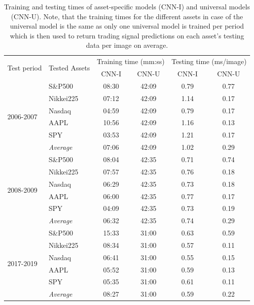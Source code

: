 \documentclass[11pt, a4paper]{article}
\begin{document}
\begin{table}[H]
\centering
\begin{tabular}{l|l|cc|cc}
\multicolumn{1}{m{1cm}|}{\multirow{2}{1cm}{Test period}} & \multicolumn{1}{m{1.5cm}|}{\multirow{2}{1.5cm}{Tested Assets}} & \multicolumn{2}{c|}{Training time (mm:ss) } & \multicolumn{2}{c}{Testing time (ms/image)} \\ \cline{3-6}
&& CNN-I & CNN-U & CNN-I & CNN-U \\ 
\hline \hline
\multirow{6}{1cm}{2006-2007} & S\&P500   & 08:30 & 42:09 & 0.79 & 0.77 \\
          & Nikkei225 & 07:12 & 42:09 & 1.14 & 0.17 \\
          & Nasdaq    & 04:59 & 42:09 & 0.79 & 0.17 \\
          & AAPL      & 10:56 & 42:09 & 1.16 & 0.13 \\
          & SPY       & 03:53 & 42:09 & 1.21 & 0.17 \\ \cline{2-6}
          & \textit{Average}   & 07:06 & 42:09 & 1.02 & 0.29 \\ \hline
\multirow{6}{1cm}{2008-2009} & S\&P500          & 08:04 & 42:35 & 0.71 & 0.74 \\
 & Nikkei225        & 07:57 & 42:35 & 0.76 & 0.18 \\
 & Nasdaq           & 06:29 & 42:35 & 0.73 & 0.18 \\
 & AAPL             & 06:00 & 42:35 & 0.77 & 0.17 \\
 & SPY              & 04:09 & 42:35 & 0.73 & 0.19 \\ \cline{2-6} 
 & \textit{Average} & 06:32 & 42:35 & 0.74 & 0.29 \\\hline
\multirow{6}{1cm}{2017-2019} & S\&P500   & 15:33 & 31:00 & 0.63 & 0.59 \\
          & Nikkei225 & 08:34 & 31:00 & 0.57 & 0.11 \\
          & Nasdaq    & 06:41 & 31:00 & 0.55 & 0.15 \\
          & AAPL      & 05:52 & 31:00 & 0.59 & 0.13 \\
          & SPY       & 05:35 & 31:00 & 0.61 & 0.11 \\ \cline{2-6}
          & \textit{Average}   & 08:27 & 31:00 & 0.59 & 0.22
\end{tabular}
\caption{Training and testing times of asset-specific models (CNN-I) and universal models (CNN-U). Note, that the training times for the different assets in case of the universal model is the same as only one universal model is trained per period which is then used to return trading signal predictions on each asset's testing data per image on average.}
\label{tbl:TimeRes}
\end{table}
\end{document}
